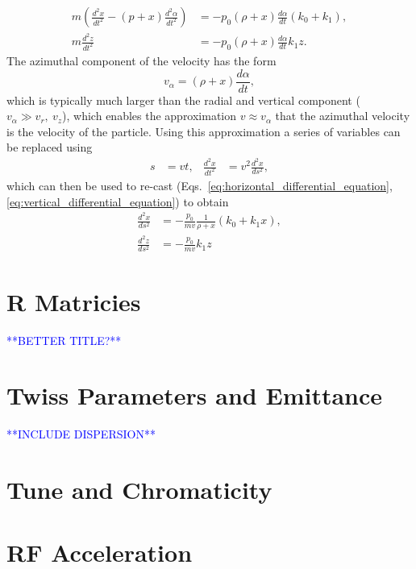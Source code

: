\documentclass[../main.tex]{subfiles}
\begin{document}
\begin{align}
m\left(\frac{d^{2}x}{dt^{2}}-\left(p+x\right)\frac{d^{2}\alpha}{dt^{2}}\right) &=-p_{0}\left(\rho+x\right)\frac{d\alpha}{dt}\left(k_{0}+k_{1}\right), 
\label{eq:horizontal_differential_equation}\\   
m\frac{d^{2}z}{dt^{2}} &= -p_{0}\left(\rho+x\right)\frac{d\alpha}{dt}k_{1}z.
\label{eq:vertical_differential_equation}
\end{align}
The azimuthal component of the velocity has the form
\begin{equation}
v_{\alpha} = \left(\rho+x\right)\frac{d\alpha}{dt},
\label{eq:azimuthal_velocity}    
\end{equation}
which is typically much larger than the radial and vertical component ($v_{\alpha}\gg v_{r},~v_{z}$), which enables the approximation $v\approx v_{\alpha}$ that the azimuthal velocity is the velocity of the particle. Using this approximation a series of variables can be replaced using
\begin{align}
s&=vt, & \frac{d^{2}x}{dt^{2}} &= v^{2}\frac{d^{2}x}{ds^{2}},
\label{eq:velocity_approximation_replacing_variables}    
\end{align}
which can then be used to re-cast (Eqs.~\ref{eq:horizontal_differential_equation}, \ref{eq:vertical_differential_equation}) to obtain
\begin{align}
\frac{d^{2}x}{ds^{2}} &= -\frac{p_{0}}{mv}\frac{1}{\rho+x}\left(k_{0}+k_{1}x\right),
\label{eq:horizontal_recast_differential_equation} \\
\frac{d^{2}z}{ds^{2}} &= -\frac{p_{0}}{mv}k_{1}z
\label{eq:vertical_recast_differential_equation}
\end{align}

\section{R Matricies} 
\textcolor{blue}{**BETTER TITLE?**}

\section{Twiss Parameters and Emittance}
\textcolor{blue}{**INCLUDE DISPERSION**}

\section{Tune and Chromaticity}

\section{RF Acceleration}
\end{document}
